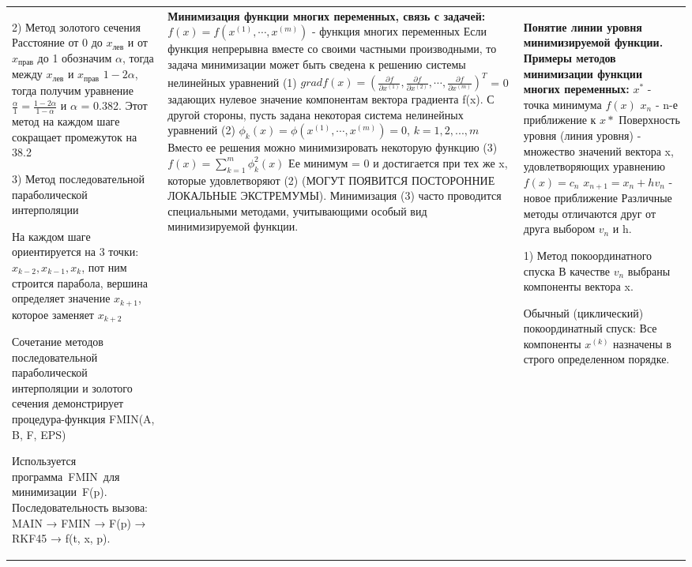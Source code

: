 \documentclass[a4paper,2pt]{article}
\begin{document}
\begin{tabular}{|p{}|p{}|p{}|}
2) Метод золотого сечения
Расстояние от 0 до $x_{лев}$ и от $x_{прав}$ до 1 обозначим $\alpha$, тогда между $x_{лев}$ и $x_{прав}$ $1-2\alpha$, тогда получим уравнение $\frac{\alpha}{1}=\frac{1-2\alpha}{1-\alpha}$ и $\alpha$ = 0.382. Этот метод на каждом шаге сокращает промежуток на 38.2%

3) Метод последовательной параболической интерполяции

На каждом шаге ориентируется на 3 точки: $x_{k-2}, x_{k-1}, x_k$, пот ним строится парабола, вершина определяет значение $x_{k+1}$, которое заменяет $x_{k+2}$

Сочетание методов последовательной параболической интерполяции и золотого сечения демонстрирует процедура-функция FMIN(A, B, F, EPS)

Используется программа FMIN для минимизации F(p). Последовательность вызова:
MAIN → FMIN → F(p) → RKF45 → f(t, x, p).
&

\textbf{Минимизация функции многих переменных, связь с задачей:}
\(f(x) = f(x^{(1)}, \cdots, x^{(m)})\) - функция многих переменных
Если функция непрерывна вместе со своими частными производными, то задача минимизации может быть сведена к решению системы нелинейных уравнений
(1) $grad f(x) = (\frac{\partial f}{\partial x^{(1)}} , \frac{\partial f}{\partial x^{(2)}}, \cdots , \frac{\partial f}{\partial x^{(m)}})^T$ = 0 задающих нулевое значение компонентам вектора градиента f(x). С другой стороны, пусть задана некоторая система нелинейных уравнений
(2) \(\phi_k(x) = \phi(x^{(1)}, \cdots, x^{(m)}) = 0\),   \(k = 1, 2, ..., m\)
Вместо ее решения можно минимизировать некоторую функцию
(3) $f(x) = \sum_{k = 1}^m \phi_k^2(x)$
Ее минимум = 0 и достигается при тех же x, которые удовлетворяют (2) (МОГУТ ПОЯВИТСЯ ПОСТОРОННИЕ ЛОКАЛЬНЫЕ ЭКСТРЕМУМЫ). Минимизация (3) часто проводится специальными методами, учитывающими особый вид минимизируемой функции.

&

\textbf{Понятие линии уровня минимизируемой функции. Примеры методов минимизации функции многих переменных:}
$x^*$ - точка минимума \(f(x)\)
$x_n$ - n-е приближение к \(x*\)
Поверхность уровня (линия уровня) - множество значений вектора x, удовлетворяющих уравнению $f(x) = c_n$
$x_{n+1} = x_n + hv_n$ - новое приближение
Различные методы отличаются друг от друга выбором $v_n$ и h.

1) Метод покоординатного спуска
В качестве $v_n$ выбраны компоненты вектора x.

Обычный (циклический) покоординатный спуск:
Все компоненты $x^{(k)}$  назначены в строго определенном порядке.


\end{tabular}
\end{document}
